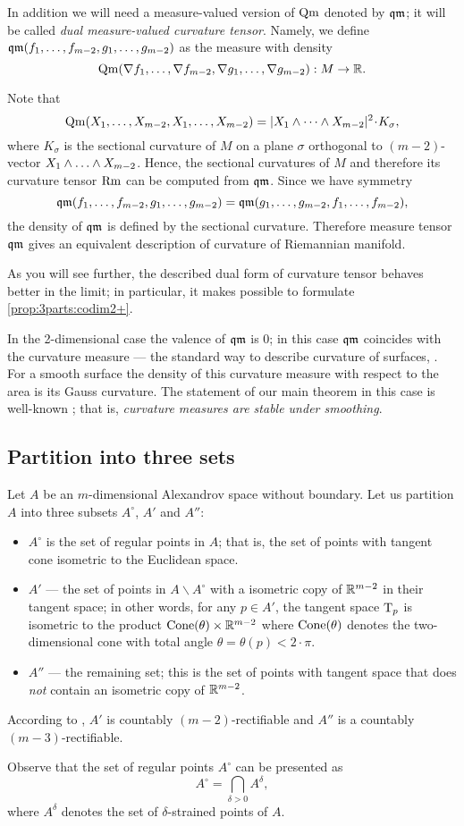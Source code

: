 In addition we will need a measure-valued version of $\operatorname{\rm Qm}$ denoted by $\operatorname{\mathfrak{qm}}$;
it will be called \emph{dual measure-valued curvature tensor}.
Namely, we define $\qm(f_1,\zz\dots,f_{m-2},g_1,\zz\dots,g_{m-2})$ as the measure with density
\[\operatorname{\rm Qm}(\nabla f_1,\dots,\nabla f_{m-2},\nabla g_1,\dots,\nabla g_{m-2}): M\to\mathbb{R}.\]

Note that 
$$\Qm(X_1,\dots,X_{m-2},X_1,\dots,X_{m-2})
=
|X_1\wedge\dots \wedge X_{m-2}|^2\cdot K_\sigma, $$
where $K_\sigma$ is the sectional curvature of $M$ 
on a plane $\sigma$ orthogonal to $(m-2)$-vector
$X_1\wedge\zz\dots \wedge X_{m-2}$.
Hence, the sectional curvatures of $M$ and therefore its curvature tensor $\operatorname{\rm Rm}$ can  be computed from
$\operatorname{\mathfrak{qm}}$.
Since we have symmetry
$$\operatorname{\mathfrak{qm}}(f_1,\dots,f_{m-2},g_1,\dots,g_{m-2})=
\operatorname{\mathfrak{qm}}(g_1,\dots,g_{m-2},f_1,\dots,f_{m-2}),$$
the density of $\operatorname{\mathfrak{qm}}$ is defined by the sectional curvature.
Therefore measure tensor $\operatorname{\mathfrak{qm}}$
gives an equivalent description of curvature of Riemannian manifold.

As you will see further, the described dual form of curvature tensor behaves better in the limit;
in particular, it makes possible to formulate \ref{prop:3parts:codim2+}.

In the 2-dimensional case the valence of $\operatorname{\mathfrak{qm}}$ is $0$;
in this case $\operatorname{\mathfrak{qm}}$ coincides with the curvature measure --- the standard way to describe curvature of surfaces, 
\cite{Resh,AZ}.
For a smooth surface the density of this curvature measure with respect to the area
is its Gauss curvature.
The statement of our main theorem in this case
is well-known \cite[VII \S13]{AZ};
that is, \emph{curvature measures are stable under smoothing}.


\subsection{Partition into three sets}\label{subsec:AAA}

Let $A$ be an $m$-dimensional Alexandrov space without boundary. 
Let us partition $A$ into three subsets $A^\circ$, $A'$ and $A''$:
\begin{itemize}
\item $A^\circ$ is the set of regular points in $A$; that is, the set of points with tangent cone isometric to the Euclidean space.
\item $A'$ --- the set of points in $A\backslash A^\circ$ with a isometric copy of $\mathbb{R}^{m-2}$ in their tangent space;
in other words, for any $p\in A'$, the tangent space $\mathrm{T}_p$ is isometric to the product $\operatorname{Cone}(\theta)\times\mathbb{R}^{m-2}$ where $\operatorname{Cone}(\theta)$ denotes the two-dimensional cone with total angle $\theta=\theta(p)<2\cdot \pi$.
\item $A''$ --- the remaining set; this is the set of points with tangent space that does \emph{not} contain an isometric copy of $\mathbb{R}^{m-2}$.
\end{itemize}
According to \cite{li-naber}, $A'$ is countably $(m-2)$-rectifiable and $A''$ is a countably $(m-3)$-rectifiable. 

Observe that the set of regular points $A^\circ$ can be presented as
$$A^{\circ}=\bigcap_{\delta>0} A^\delta,$$
where $A^\delta$ denotes the set of $\delta$-strained points of $A$.
